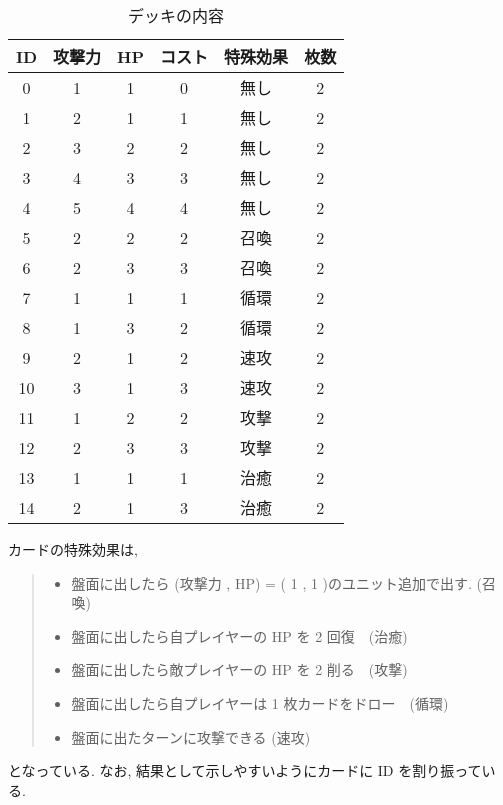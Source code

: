 \documentclass{jarticle}     %
\begin{document}
\begin{table}[h]
  \centering
  \caption{デッキの内容}
  \label{table:deck}
  \begin{tabular}{|c|c|c|c|c|c|}
  \hline
  ID & 攻撃力 & HP & コスト & 特殊効果 & 枚数 \\ \hline
  0 & 1 & 1 & 0 & 無し & 2 \\ \hline
  1 & 2 & 1 & 1 & 無し & 2 \\ \hline
  2 & 3 & 2 & 2 & 無し & 2 \\ \hline
  3 & 4 & 3 & 3 & 無し & 2 \\ \hline
  4 & 5 & 4 & 4 & 無し & 2 \\ \hline
  5 & 2 & 2 & 2 & 召喚 & 2 \\ \hline
  6 & 2 & 3 & 3 & 召喚 & 2 \\ \hline
  7 & 1 & 1 & 1 & 循環 & 2 \\ \hline
  8 & 1 & 3 & 2 & 循環 & 2 \\ \hline
  9 & 2 & 1 & 2 & 速攻 & 2 \\ \hline
  10 & 3 & 1 & 3 & 速攻 & 2 \\ \hline
  11 & 1 & 2 & 2 & 攻撃 & 2 \\ \hline
  12 & 2 & 3 & 3 & 攻撃 & 2 \\ \hline
  13 & 1 & 1 & 1 & 治癒 & 2 \\ \hline
  14 & 2 & 1 & 3 & 治癒 & 2 \\ \hline
  \end{tabular}
  \end{table}

  カードの特殊効果は, 
  \begin{quote}
    \begin{itemize}
     \item 盤面に出したら (攻撃力 , HP) = ( 1 , 1 )のユニット追加で出す. (召喚)
     \item 盤面に出したら自プレイヤーの HP を 2 回復　(治癒)
     \item 盤面に出したら敵プレイヤーの HP を 2 削る　(攻撃)
     \item 盤面に出したら自プレイヤーは 1 枚カードをドロー　(循環)
     \item 盤面に出たターンに攻撃できる (速攻)
    \end{itemize}
   \end{quote}
   となっている.
  なお, 結果として示しやすいようにカードに ID を割り振っている.
\end{document}
